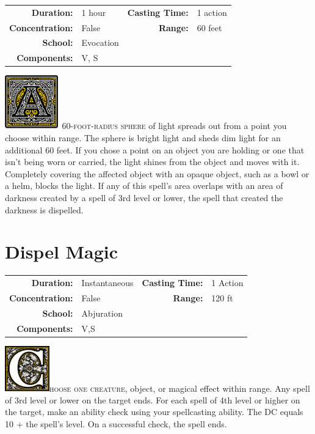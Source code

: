 \documentclass[12pt,showtrims]{memoir}
\begin{document}
{
\small\centering\vspace{-6pt}
\begin{tabular}{rlrl}
\toprule

\textbf{Duration:} & 1 hour &
\textbf{Casting Time:} & 1 action \\
\textbf{Concentration:} & False &
\textbf{Range:} & 60 feet \\
\textbf{School:} & Evocation \\
\textbf{Components:} & \multicolumn{3}{p{0.7\textwidth}}{V, S}\\

\bottomrule
\end{tabular}
}

\vspace{1\baselineskip}\noindent 
\lettrine[lines=4]{\includegraphics[height=66pt]{initials/A.png}}{\ 60-foot-radius sphere} of light spreads out from a point you choose within range. The sphere is bright light and sheds dim light for an additional 60 feet. If you chose a point on an object you are holding or one that isn't being worn or carried, the light shines from the object and moves with it. Completely covering the affected object with an opaque object, such as a bowl or a helm, blocks the light. If any of this spell's area overlaps with an area of darkness created by a spell of 3rd level or lower, the spell that created the darkness is dispelled.

\newpage
\section*{Dispel Magic}
{
\small\centering\vspace{-6pt}
\begin{tabular}{rlrl}
\toprule

\textbf{Duration:} & Instantaneous &
\textbf{Casting Time:} & 1 Action \\
\textbf{Concentration:} & False &
\textbf{Range:} & 120 ft \\
\textbf{School:} & Abjuration \\
\textbf{Components:} & \multicolumn{3}{p{0.7\textwidth}}{V,S}\\

\bottomrule
\end{tabular}
}
\vspace{1\baselineskip}\noindent
\lettrine[lines=4]{\includegraphics[height=56pt]{initials/C.png}}{hoose one creature}, object, or magical effect within range. Any spell of 3rd level or lower on the target ends. For each spell of 4th level or higher on the target, make an ability check using your spellcasting ability. The DC equals 10 + the spell's level. On a successful check, the spell ends.
\end{document}
